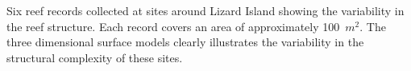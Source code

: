 \label{fig:reef_record_example}Six reef records collected at sites around Lizard Island showing the variability in the reef structure.  Each record covers an area of approximately 100~$m^2$.  The three dimensional surface models clearly illustrates the variability in the structural complexity of these sites.